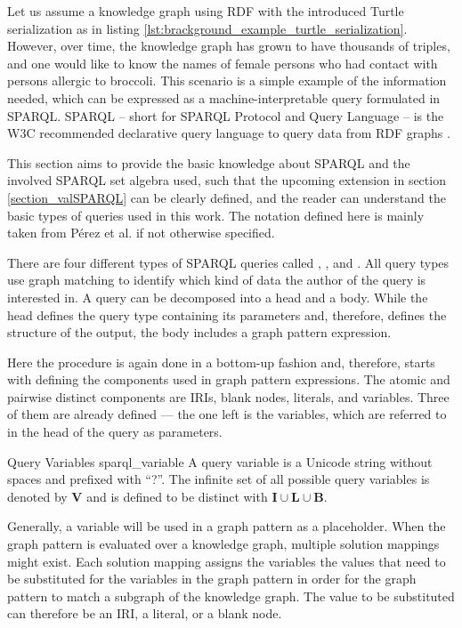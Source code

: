 
Let us assume a knowledge graph using RDF with the introduced Turtle serialization as in listing \ref{lst:brackground_example_turtle_serialization}. However, over time, the knowledge graph has grown to have thousands of triples, and one would like to know the names of female persons who had contact with persons allergic to broccoli. This scenario is a simple example of the information needed, which can be expressed as a machine-interpretable query formulated in SPARQL. 
SPARQL -- short for SPARQL Protocol and Query Language -- is the W3C recommended declarative query language to query data from RDF graphs \cite{prudhommeaux2008sparql}. 

This section aims to provide the basic knowledge about SPARQL and the involved SPARQL set algebra used, such that the upcoming extension in section \ref{section_valSPARQL} can be clearly defined, and the reader can understand the basic types of queries used in this work. The notation defined here is mainly taken from Pérez et al. \cite{perez2009semantics} if not otherwise specified.

There are four different types of SPARQL queries called , ,  and . All query types use graph matching to identify which kind of data the author of the query is interested in. A query can be decomposed into a head and a body. While the head defines the query type containing its parameters and, therefore, defines the structure of the output, the body includes a graph pattern expression. 

Here the procedure is again done in a bottom-up fashion and, therefore, starts with defining the components used in graph pattern expressions. The atomic and pairwise distinct components are IRIs, blank nodes, literals, and variables. Three of them are already defined — the one left is the variables, which are referred to in the head of the query as parameters. 

\begin{Def}{Query Variables \cite{prudhommeaux2008sparql}}{sparql_variable}
A query variable is a Unicode string without spaces and prefixed with ``?''.
The infinite set of all possible query variables is denoted by $\mathbf{V}$ and is defined to be distinct with $\mathbf{I} \cup \mathbf{L} \cup \mathbf{B}$.
\end{Def}

Generally, a variable will be used in a graph pattern as a placeholder. When the graph pattern is evaluated over a knowledge graph, multiple solution mappings might exist. Each solution mapping assigns the variables the values that need to be substituted for the variables in the graph pattern in order for the graph pattern to match a subgraph of the knowledge graph. The value to be substituted can therefore be an IRI, a literal, or a blank node.

